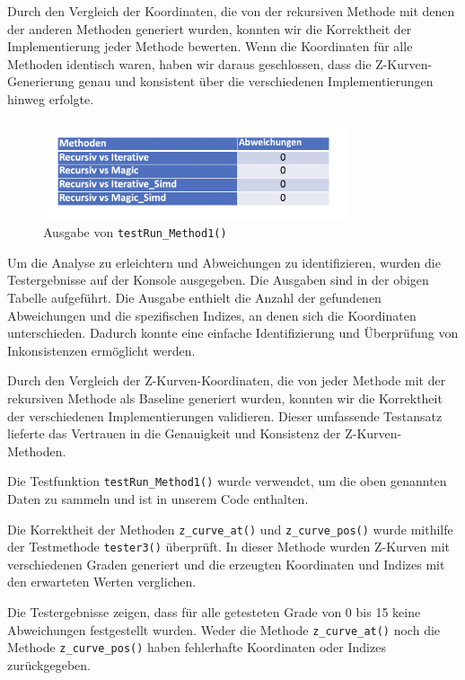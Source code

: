 \documentclass[course=erap]{aspdoc}
\begin{document}
\noindent Durch den Vergleich der Koordinaten, die von der rekursiven Methode mit denen der anderen Methoden generiert wurden, konnten wir die Korrektheit der Implementierung jeder Methode bewerten. Wenn die Koordinaten für alle Methoden identisch waren, haben wir daraus geschlossen, dass die Z-Kurven-Generierung genau und konsistent über die verschiedenen Implementierungen hinweg erfolgte.


\begin{figure}[H]
  \centering
  \includegraphics[width=0.8\textwidth]{resources/korrektheit_data.png}
  \caption{Ausgabe von \texttt{testRun\_Method1()}}
  \label{fig:Ausgabe von testRun_Method1()}
\end{figure}

\noindent Um die Analyse zu erleichtern und Abweichungen zu identifizieren, wurden die Testergebnisse auf der Konsole ausgegeben. Die Ausgaben sind in der obigen Tabelle aufgeführt. Die Ausgabe enthielt die Anzahl der gefundenen Abweichungen und die spezifischen Indizes, an denen sich die Koordinaten unterschieden. Dadurch konnte eine einfache Identifizierung und Überprüfung von Inkonsistenzen ermöglicht werden.

\noindent Durch den Vergleich der Z-Kurven-Koordinaten, die von jeder Methode mit der rekursiven Methode als Baseline generiert wurden, konnten wir die Korrektheit der verschiedenen Implementierungen validieren. Dieser umfassende Testansatz lieferte das Vertrauen in die Genauigkeit und Konsistenz der Z-Kurven-Methoden.

\noindent Die Testfunktion \texttt{testRun\_Method1()} wurde verwendet, um die oben genannten Daten zu sammeln und ist in unserem Code enthalten.

\noindent Die Korrektheit der Methoden \texttt{z\_curve\_at()} und \texttt{z\_curve\_pos()} wurde mithilfe der Testmethode \texttt{tester3()} überprüft. In dieser Methode wurden Z-Kurven mit verschiedenen Graden generiert und die erzeugten Koordinaten und Indizes mit den erwarteten Werten verglichen.

\noindent Die Testergebnisse zeigen, dass für alle getesteten Grade von 0 bis 15 keine Abweichungen festgestellt wurden. Weder die Methode \texttt{z\_curve\_at()} noch die Methode \texttt{z\_curve\_pos()} haben fehlerhafte Koordinaten oder Indizes zurückgegeben.
\end{document}
